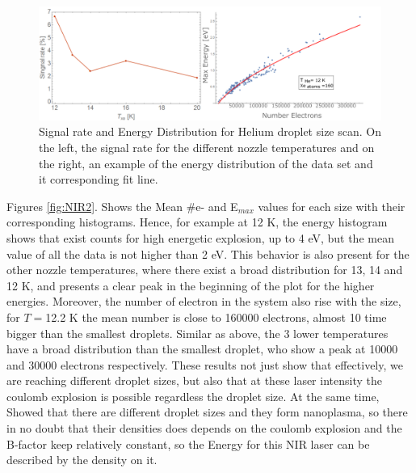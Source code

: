  

\begin{figure}[h!]
\centering
\includegraphics[width=14 cm]{../Images/results/NI_He_Dropletsize/signalrateee.png}
\caption[NIR He, Signal rate and Energy Distribution]{Signal rate and Energy Distribution for Helium droplet size scan. On the left, the signal rate for the different nozzle temperatures and on the right, an example of the energy distribution of the data set and it corresponding fit line. }
\label{fig:NIRsrEnergy}
\end{figure}


Figures \ref{fig:NIR2}. Shows the Mean $\#$e- and E$_{max}$ values for each size with their corresponding histograms. Hence, for example at 12 K, the energy histogram shows that exist counts for high energetic explosion, up to 4 eV, but the mean value of all the data is not higher than 2 eV. This behavior is also present for the other nozzle temperatures, where there exist a broad distribution for 13, 14 and 12 K, and presents a clear peak in the beginning of the plot for the higher energies.
Moreover, the number of electron in the system also rise with the size, for $T=$12.2 K the mean number is close to 160000 electrons, almost 10 time bigger than the smallest droplets. Similar as above, the 3 lower temperatures have a broad distribution than the smallest droplet, who show a peak at 10000 and 30000 electrons respectively. These results not just show that effectively, we are reaching different droplet sizes, but also that at these laser intensity the coulomb explosion is possible regardless the droplet size. At the same time, Showed that there are different droplet sizes and they form nanoplasma, so there in no doubt that their densities does depends on the coulomb explosion and the B-factor keep relatively constant, so the Energy for this NIR laser can be described by the density on it.



